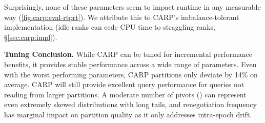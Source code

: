 \figCarpEvalTuneXput

Surprisingly, none of these parameters seem to impact runtime in any measurable way
(\cref{fig:carp:eval-rtprt}).
We attribute this to CARP's imbalance-tolerant implementation (idle ranks can cede CPU time to
straggling ranks, \S\ref{sec:carp:impl}).

\textbf{Tuning Conclusion.
}
While CARP can be tuned for incremental performance benefits, it provides stable performance across
a wide range of parameters.
Even with the worst performing parameters, CARP partitions only deviate by 14\% on average.
CARP will still provide excellent query performance for queries not reading from larger partitions.
A moderate number of pivots () can represent even extremely skewed distributions
with long tails, and renegotiation frequency has marginal impact on partition quality as it only
addresses intra-epoch drift.
